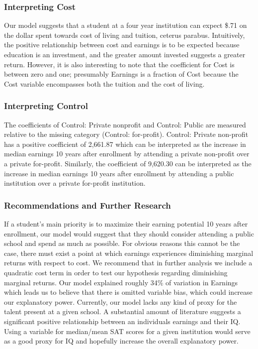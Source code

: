 \documentclass[%
 reprint,
 amsmath,amssymb,
 aps,
]{revtex4-1}
\begin{document}
\subsubsection{Interpreting Cost}
Our model suggests that a student at a four year institution can expect \$.71 on the dollar spent towards cost of living and tuition, ceterus parabus. Intuitively, the positive relationship between cost and earnings is to be expected because education is an investment, and the greater amount invested suggests a greater return. However, it is also interesting to note that the coefficient for Cost is between zero and one; presumably Earnings is a fraction of Cost because the Cost variable encompasses both the tuition and the cost of living. 

\subsubsection{Interpreting Control}
The coefficients of Control: Private nonprofit and Control: Public are measured relative to the missing category (Control: for-profit).  Control: Private non-profit has a positive coefficient of 2,661.87 which can be interpreted as the increase in median earnings 10 years after enrollment by attending a private non-profit over a private for-profit.  Similarly, the coefficient of 9,620.30 can be interpreted as the increase in median earnings 10 years after enrollment by attending a public institution over a private for-profit institution.


\subsubsection{Recommendations and Further Research}
If a student's main priority is to maximize their earning potential 10 years after enrollment, our model would suggest that they should consider attending a public school and spend as much as possible. For obvious reasons this cannot be the case, there must exist a point at which earnings experiences diminishing marginal returns with respect to cost. We recommend that in further analysis we include a quadratic cost term in order to test our hypothesis regarding diminishing marginal returns. Our model explained roughly 34\% of variation in Earnings which leads us to believe that there is omitted variable bias, which could increase our explanatory power.  Currently, our model lacks any kind of proxy for the talent present at a given school.  A substantial amount of literature suggests a significant positive relationship between an individuals earnings and their IQ. Using a variable for median/mean SAT scores for a given institution would serve as a good proxy for IQ and hopefully increase the overall explanatory power.  
\end{document}
